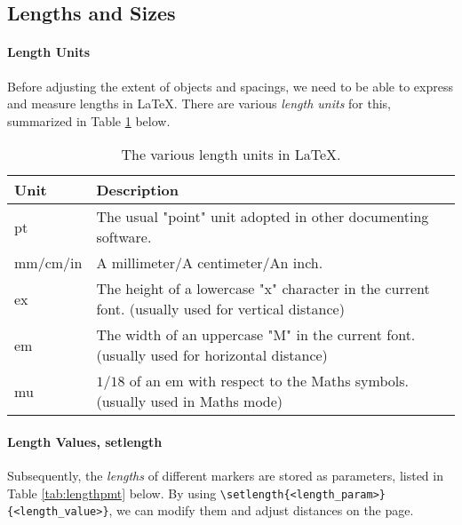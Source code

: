 \subsection{Lengths and Sizes}

\paragraph{Length Units}
Before adjusting the extent of objects and spacings, we need to be able to express and measure lengths in \LaTeX{}. There are various \textit{length units} for this, summarized in Table \ref{tab:lengthunit} below.
\begin{table}
\begin{tabularx}{\textwidth}{|l|X|}
\hline
Unit & Description \\
\hline
pt & The usual "point" unit adopted in other documenting software. \\
\hline
mm/cm/in & A millimeter/A centimeter/An inch. \\
\hline
ex & The height of a lowercase "x" character in the current font. (usually used for vertical distance) \\
\hline
em & The width of an uppercase "M" in the current font. (usually used for horizontal distance) \\
\hline
mu & $1/18$ of an em with respect to the Maths symbols. (usually used in Maths mode) \\
\hline
\end{tabularx}
\caption{The various length units in \LaTeX{}.}
\label{tab:lengthunit}
\end{table}

\paragraph{Length Values, setlength}
Subsequently, the \textit{lengths} of different markers are stored as parameters, listed in Table \ref{tab:lengthpmt} below. By using \texttt{\textbackslash setlength\allowbreak\{<length\_param>\}\{<length\_value>\}}, we can modify them and adjust distances on the page.


